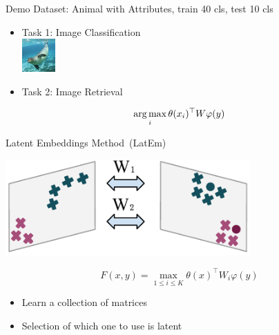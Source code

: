 \documentclass[mathserif, xcolor=table]{beamer}
\def\argmax{\mathop{\rm arg\,max}\limits}%
\begin{document}
\begin{frame}{Demo}
Dataset: Animal with Attributes, train 40 cls, test 10 cls
\begin{itemize}
\item Task 1: Image Classification \\ 
\includegraphics[width=0.1\textwidth]{seal}
\item Task 2: Image Retrieval
\end{itemize}

\begin{equation*}
	\argmax_{i} \theta(x_i)^\top W \varphi(y) 
\end{equation*}

\end{frame}



\begin{frame}{Latent Embeddings Method~(LatEm)}
\vspace{-4mm}
\begin{center}
\includegraphics[width=0.7\textwidth]{Latem}
\end{center}
\vspace{-4mm}
\begin{equation*}
F(x,y) = \max_{1\leq i \leq K} \theta(x)^\top W_i \varphi(y)
\end{equation*}
\pause

\begin{itemize}
	\item Learn a collection of matrices
	\item Selection of which one to use is latent
\end{itemize}

\end{frame}
\end{document}
